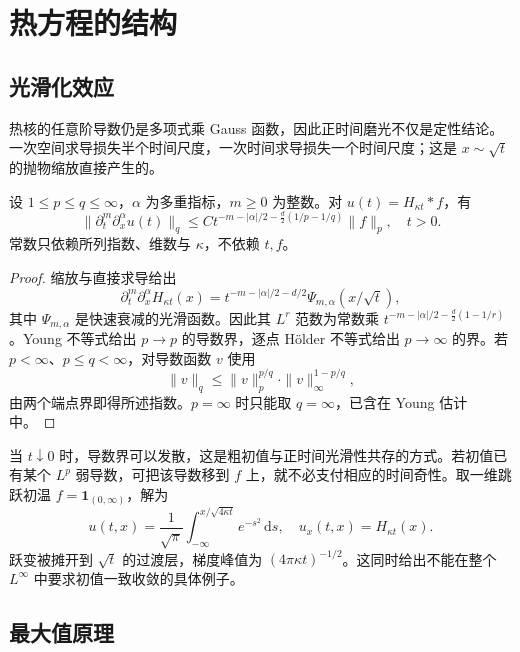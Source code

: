 \section{热方程的结构}
\label{b2:sec:1203}

\subsection{光滑化效应}
\label{b2:subsec:120301}

热核的任意阶导数仍是多项式乘 Gauss 函数，因此正时间磨光不仅是定性结论。一次空间求导损失半个时间尺度，一次时间求导损失一个时间尺度；这是 \(x\sim\sqrt t\) 的抛物缩放直接产生的。

\begin{theorem}[热流的导数估计]\label{b2:thm:12-smoothing}
设 \(1\leq p\leq q\leq\infty\)，\(\alpha\) 为多重指标，\(m\geq0\) 为整数。对 \(u(t)=H_{\kappa t}*f\)，有
\begin{equation}\label{b2:eq:12-smoothing}
 \|\partial_t^m\partial_x^\alpha u(t)\|_q
 \leq C t^{-m-|\alpha|/2-\frac d2(1/p-1/q)}\|f\|_p,
 \quad t>0.
\end{equation}
常数只依赖所列指数、维数与 \(\kappa\)，不依赖 \(t,f\)。
\end{theorem}
\begin{proof}
缩放与直接求导给出
\[
 \partial_t^m\partial_x^\alpha H_{\kappa t}(x)
 =t^{-m-|\alpha|/2-d/2}\Psi_{m,\alpha}(x/\sqrt t),
\]
其中 \(\Psi_{m,\alpha}\) 是快速衰减的光滑函数。因此其 \(L^r\) 范数为常数乘 \(t^{-m-|\alpha|/2-\frac d2(1-1/r)}\)。Young 不等式给出 \(p\to p\) 的导数界，逐点 Hölder 不等式给出 \(p\to\infty\) 的界。若 \(p<\infty\)、\(p\leq q<\infty\)，对导数函数 \(v\) 使用
\[
 \|v\|_q\leq\|v\|_p^{p/q}\cdot\|v\|_\infty^{1-p/q},
\]
由两个端点界即得所述指数。\(p=\infty\) 时只能取 \(q=\infty\)，已含在 Young 估计中。
\end{proof}

当 \(t\downarrow0\) 时，导数界可以发散，这是粗初值与正时间光滑性共存的方式。若初值已有某个 \(L^p\) 弱导数，可把该导数移到 \(f\) 上，就不必支付相应的时间奇性。取一维跳跃初温 \(f=\mathbf1_{(0,\infty)}\)，解为
\[
 u(t,x)=\dfrac1{\sqrt\pi}\int_{-\infty}^{x/\sqrt{4\kappa t}}e^{-s^2}\,\mathrm{d}s,
 \quad u_x(t,x)=H_{\kappa t}(x).
\]
跃变被摊开到 \(\sqrt t\) 的过渡层，梯度峰值为 \((4\pi\kappa t)^{-1/2}\)。这同时给出不能在整个 \(L^\infty\) 中要求初值一致收敛的具体例子。

\subsection{最大值原理}
\label{b2:subsec:120302}

